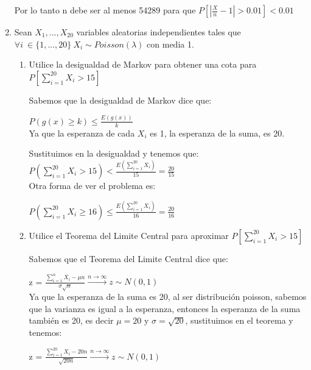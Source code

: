 \documentclass[11pt,a4paper]{report}
\begin{document}
\begin{enumerate}
{        Por lo tanto n debe ser al menos 54289 para que $P[|\frac{X}{n}-1| > 0.01] < 0.01$\\
		}

		\item{
			Sean $X_{1},...,X_{20}$ variables aleatorias independientes tales que $\forall i \ \in \lbrace 1,...,20 \rbrace \ X_{i} \sim Poisson(\lambda) $ con media 1.\\
			\begin{enumerate}
			    \item{Utilice la desigualdad de Markov para obtener una cota para $P[\sum_{i=1}^{20}X_{i}>15]$} 
			    
			    Sabemos que la desigualdad de Markov dice que:
			    
			    $P(g(x) \geq k) \leq \frac{E(g(x))}{k}$\\
			    
			    Ya que la esperanza de cada $X_{i}$ es 1, la esperanza de la suma, es 20.
		    
			    Sustituimos en la desigualdad y tenemos que:\\
			    
			    $P(\sum_{i=1}^{20}X_{i}>15) < \frac{E(\sum_{i=1}^{20}X_{i})}{15} = \frac{20}{15}$\\
			    
			    Otra forma de ver el problema es:
			    
			    $P(\sum_{i=1}^{20}X_{i}\geq 16) \leq \frac{E(\sum_{i=1}^{20}X_{i})}{16} = \frac{20}{16}$\\
			        
			    
			    \item{Utilice el Teorema del Limite Central para aproximar $P[\sum_{i=1}^{20}X_{i}>15]$}
			    
				Sabemos que el Teorema del Limite Central dice que:
				
 				z = $\frac{\sum_{i=1}^{n} X_{i} - \mu n }{\sigma \sqrt{n}}  \xrightarrow{n \to \infty}  z \sim N(0,1)$\\
			    
				Ya que la esperanza de la suma es 20, al ser distribución poisson, sabemos que la varianza es igual a la esperanza, entonces la esperanza de la suma también es 20, es decir $\mu = 20$ y $\sigma = \sqrt{20}$, sustituimos en el teorema y tenemos:
				
				z = $\frac{\sum_{i=1}^{20} X_{i} - 20n }{\sqrt{20n}}  \xrightarrow{n \to \infty}  z \sim N(0,1)$\\
				

\end{enumerate}}
\end{enumerate}
\end{document}
